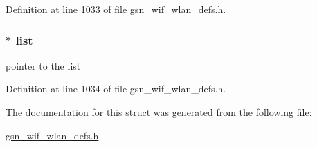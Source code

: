 Definition at line 1033 of file gsn\_\-wif\_\-wlan\_\-defs.h.

\hypertarget{a00321_ae526dc03ee9462e20c6525368974e046}{
\subsubsection[{list}]{$\ast$ {\bf list}}}
\label{a00321_ae526dc03ee9462e20c6525368974e046}
pointer to the list 

Definition at line 1034 of file gsn\_\-wif\_\-wlan\_\-defs.h.



The documentation for this struct was generated from the following file:\begin{DoxyCompactItemize}
\item 
\hyperlink{a00613}{gsn\_\-wif\_\-wlan\_\-defs.h}\end{DoxyCompactItemize}
